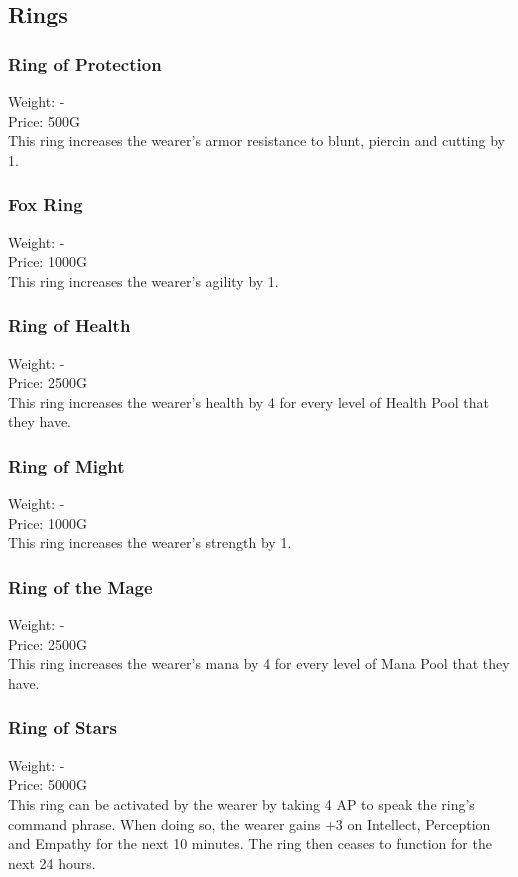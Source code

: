 \subsection{Rings}

\subsubsection{Ring of Protection}
Weight: -\\
Price: 500G\\
This ring increases the wearer's armor resistance to blunt, piercin and cutting by 1.

\subsubsection{Fox Ring}
Weight: -\\
Price: 1000G\\
This ring increases the wearer's agility by 1.

\subsubsection{Ring of Health}
Weight: -\\
Price: 2500G\\
This ring increases the wearer's health by 4 for every level of Health Pool that they have.

\subsubsection{Ring of Might}
Weight: -\\
Price: 1000G\\
This ring increases the wearer's strength by 1.

\subsubsection{Ring of the Mage}
Weight: -\\
Price: 2500G\\
This ring increases the wearer's mana by 4 for every level of Mana Pool that they have.

\subsubsection{Ring of Stars}
Weight: -\\
Price: 5000G\\
This ring can be activated by the wearer by taking 4 AP to speak the ring's command phrase. When doing so, the wearer gains +3 on Intellect, Perception and Empathy  for the next 10 minutes. The ring then ceases to function for the next 24 hours.